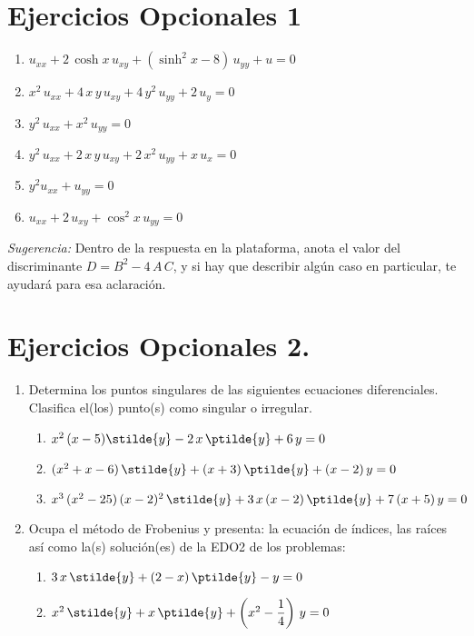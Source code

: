\section{Ejercicios Opcionales 1}
\begin{enumerate}
\item $u_{xx} +  2 \, \cosh x \, u_{xy} + (\sinh^{2} x - 8) \, u_{yy} + u = 0$
\item $x^{2} \, u_{xx} + 4 \, x \, y \, u_{xy} + 4 \, y^{2} \, u_{yy} + 2 \, u_{y} = 0$
\item $y^{2} \, u_{xx} + x^{2} \, u_{yy} = 0$
\item $y^{2} \, u_{xx} + 2 \, x \, y \, u_{xy} + 2 \, x^{2} \, u_{yy} + x \, u_{x} = 0$
\item $y^{2} u_{xx} + u_{yy} = 0$
\item $u_{xx} + 2 \, u_{xy} + \cos^{2} x \, u_{yy} = 0$
\end{enumerate}
\emph{Sugerencia: } Dentro de la respuesta en la plataforma, anota el valor del discriminante $D = B^{2} - 4 \, A \, C$, y si hay que describir algún caso en particular, te ayudará para esa aclaración.
\section{Ejercicios Opcionales 2.}
\begin{enumerate}
\item Determina los puntos singulares de las siguientes ecuaciones diferenciales. Clasifica el(los) punto(s) como singular o irregular.
\begin{enumerate}
\item $x^{2} \, (x - 5) \stilde{y} - 2 \, x \, \ptilde{y} + 6 \, y = 0$
\item $(x^{2} + x - 6) \, \stilde{y} + (x + 3)  \, \ptilde{y} + (x - 2) \, y = 0$
\item $x^{3} \, (x^{2} - 25) \, (x - 2)^{2} \, \stilde{y} + 3 \, x \, (x - 2) \, \ptilde{y} + 7 \, (x + 5) \, y = 0$
\end{enumerate}
\item Ocupa el método de Frobenius y presenta: la ecuación de índices, las raíces así como la(s) solución(es) de la EDO2 de los problemas:
\begin{enumerate}
\item $3 \, x \, \stilde{y} + (2 - x) \, \ptilde{y} - y = 0$
\item $x^{2} \, \stilde{y} + x \, \ptilde{y} + \left( x^{2} - \dfrac{1}{4} \right) \, y = 0$
\end{enumerate}
\end{enumerate}
